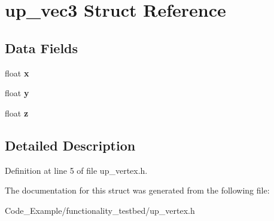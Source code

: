 \hypertarget{structup__vec3}{}\section{up\+\_\+vec3 Struct Reference}
\label{structup__vec3}
\subsection*{Data Fields}
\begin{DoxyCompactItemize}
\item 
\hypertarget{structup__vec3_ad0da36b2558901e21e7a30f6c227a45e}{}float {\bfseries x}\label{structup__vec3_ad0da36b2558901e21e7a30f6c227a45e}

\item 
\hypertarget{structup__vec3_aa4f0d3eebc3c443f9be81bf48561a217}{}float {\bfseries y}\label{structup__vec3_aa4f0d3eebc3c443f9be81bf48561a217}

\item 
\hypertarget{structup__vec3_af73583b1e980b0aa03f9884812e9fd4d}{}float {\bfseries z}\label{structup__vec3_af73583b1e980b0aa03f9884812e9fd4d}

\end{DoxyCompactItemize}


\subsection{Detailed Description}


Definition at line 5 of file up\+\_\+vertex.\+h.



The documentation for this struct was generated from the following file\+:\begin{DoxyCompactItemize}
\item 
Code\+\_\+\+Example/functionality\+\_\+testbed/up\+\_\+vertex.\+h\end{DoxyCompactItemize}
